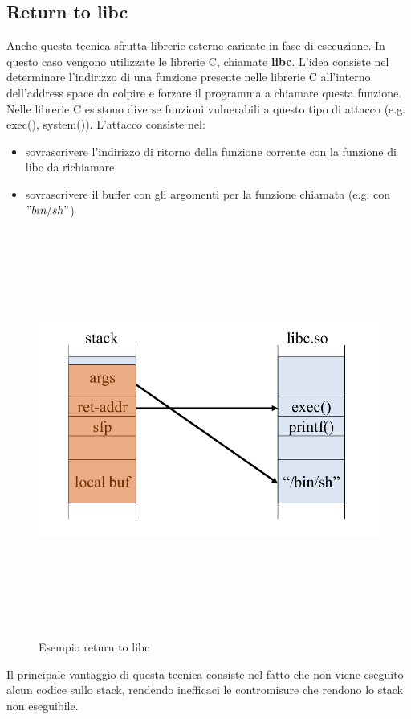 \subsection{Return to libc}
Anche questa tecnica sfrutta librerie esterne caricate in fase di esecuzione. In questo caso vengono utilizzate le librerie C, chiamate \textbf{libc}. L'idea consiste nel determinare l'indirizzo di una funzione presente nelle librerie C all'interno dell'address space da colpire e forzare il programma a chiamare questa funzione. Nelle librerie C esistono diverse funzioni vulnerabili a questo tipo di attacco (e.g. exec(), system()).
L'attacco consiste nel:
\begin{itemize}
  \item sovrascrivere l'indirizzo di ritorno della funzione corrente con la funzione di libc da richiamare 
  \item sovrascrivere il buffer con gli argomenti per la funzione chiamata (e.g. con $"bin/sh"$)
\end{itemize}
\begin{figure}[htbp]
	\centering%
	\subfigure%
	{\includegraphics[height=13cm, width=13cm, keepaspectratio]{Immagini/sistemi_operativi/return_libc.png}}
	\caption{Esempio return to libc\label{fig:return_libc}} 	
\end{figure}
Il principale vantaggio di questa tecnica consiste nel fatto che non viene eseguito alcun codice sullo stack, rendendo inefficaci le contromisure che rendono lo stack non eseguibile.

